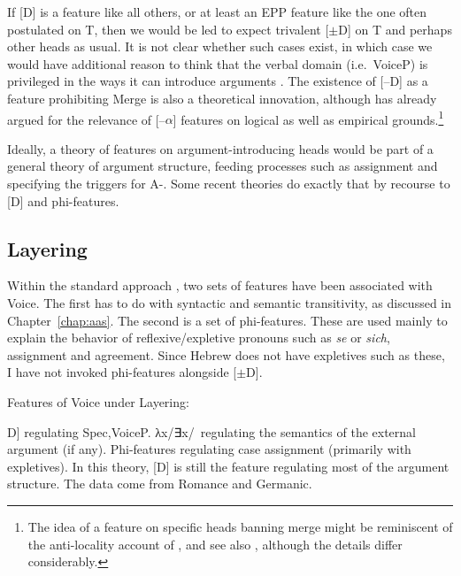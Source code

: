 \begin{exe}
\begin{xlist}
\begin{xlist}
\begin{xlist}
\begin{xlist}
\begin{xlist}
\begin{xlist}
\begin{exe}
\begin{xlist}
\begin{exe}
\begin{exe}
\begin{xlist}
\begin{exe}
\begin{exe}
\begin{xlist}
\begin{exe}
\begin{xlist}
\begin{exe}
\begin{xlist}
\begin{exe}
\begin{xlist}
\begin{exe}
\begin{xlist}
\label{r1:g:2c1}If [D] is a feature like all others, or at least an EPP feature like the one often postulated on T, then we would be led to expect trivalent [$\pm$D] on T and perhaps other heads as usual. It is not clear whether such cases exist, in which case we would have additional reason to think that the verbal domain (i.e.~VoiceP) is privileged in the ways it can introduce arguments \citep{grimshaw00,woodmarantz17}. The existence of [--D] as a feature prohibiting Merge is also a theoretical innovation, although \cite{harbour11,harbour14} has already argued for the relevance of [--$\alpha$] features on logical as well as empirical grounds.\footnote{The idea of a feature on specific heads banning merge might be reminiscent of the anti-locality account of \cite{grohmann03}, and see also \cite{baier18phd}, although the details differ considerably.}

Ideally, a theory of features on argument-introducing heads would be part of a general theory of argument structure, feeding processes such as  assignment and specifying the triggers for A-. Some recent theories do exactly that by recourse to [D] and phi-features.

	\subsection{Layering}
Within the standard  approach \citep{schaefer08,schaefer12,schaefer17oup}, two sets of features have been associated with Voice. The first has to do with syntactic and semantic transitivity, as discussed in Chapter~\ref{chap:aas}. The second is a set of phi-features. These are used mainly to explain the behavior of reflexive/expletive pronouns such as  \emph{se} or  \emph{sich},  assignment and agreement. Since Hebrew does not have expletives such as these, I have not invoked phi-features alongside [$\pm$D].
 \begin{exe}
 \ex  Features of Voice under Layering: 
 \begin{xlist} 
 	\ex  {[}D] regulating Spec,VoiceP. 
 	\ex  λx/∃x/\zero~regulating the semantics of the external argument (if any). 
 	\ex  Phi-features regulating case assignment (primarily with expletives). 
 \z
\z 
In this theory, [D] is still the feature regulating most of the argument structure. The data come from Romance and Germanic.


\end{xlist}
\end{exe}
\end{xlist}
\end{exe}
\end{xlist}
\end{exe}
\end{xlist}
\end{exe}
\end{xlist}
\end{exe}
\end{xlist}
\end{exe}
\end{exe}
\end{xlist}
\end{exe}
\end{exe}
\end{xlist}
\end{exe}
\end{xlist}
\end{xlist}
\end{xlist}
\end{xlist}
\end{xlist}
\end{xlist}
\end{exe}
